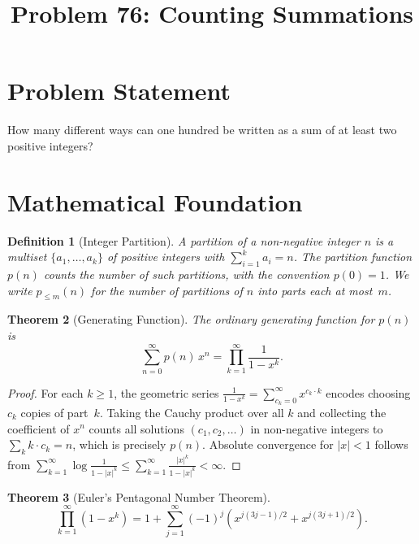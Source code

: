\documentclass[11pt]{article}
\title{Problem 76: Counting Summations}
\author{}
\date{}
\newtheorem{theorem}{Theorem}
\newtheorem{definition}[theorem]{Definition}
\begin{document}
\maketitle

\section{Problem Statement}

How many different ways can one hundred be written as a sum of at least two positive integers?

\section{Mathematical Foundation}

\begin{definition}[Integer Partition]
A \emph{partition} of a non-negative integer $n$ is a multiset $\{a_1, \ldots, a_k\}$ of positive integers with $\sum_{i=1}^k a_i = n$. The \emph{partition function} $p(n)$ counts the number of such partitions, with the convention $p(0) = 1$. We write $p_{\le m}(n)$ for the number of partitions of $n$ into parts each at most~$m$.
\end{definition}

\begin{theorem}[Generating Function]
The ordinary generating function for $p(n)$ is
\[
\sum_{n=0}^{\infty} p(n)\,x^n = \prod_{k=1}^{\infty} \frac{1}{1 - x^k}.
\]
\end{theorem}

\begin{proof}
For each $k \geq 1$, the geometric series $\frac{1}{1-x^k} = \sum_{c_k=0}^{\infty} x^{c_k \cdot k}$ encodes choosing $c_k$ copies of part~$k$. Taking the Cauchy product over all $k$ and collecting the coefficient of $x^n$ counts all solutions $(c_1, c_2, \ldots)$ in non-negative integers to $\sum_k k \cdot c_k = n$, which is precisely $p(n)$. Absolute convergence for $|x| < 1$ follows from $\sum_{k=1}^{\infty} \log \frac{1}{1-|x|^k} \leq \sum_{k=1}^{\infty} \frac{|x|^k}{1-|x|^k} < \infty$.
\end{proof}

\begin{theorem}[Euler's Pentagonal Number Theorem]
\[
\prod_{k=1}^{\infty}(1 - x^k) = 1 + \sum_{j=1}^{\infty} (-1)^j \left(x^{j(3j-1)/2} + x^{j(3j+1)/2}\right).
\]
\end{theorem}
\end{document}
